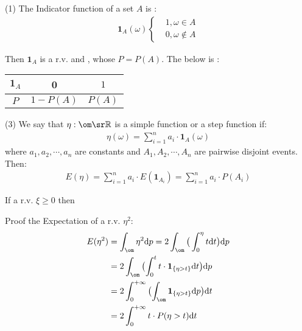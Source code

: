 \begin{definition}
     (1) The Indicator function of a set $A$ is :
    \begin{align*}
        \mathbf{1}_A(\omega)
        \left\{
        \begin{aligned}
            & 1, \omega \in A \\
            & 0, \omega \notin A
        \end{aligned}
        \right.
    \end{align*}

    Then $\mathbf{1}_A$ is a r.v. and , whose $P = P(A)$.
    The below is :
    \begin{center}
        \begin{tabular}{c|cc}
            $\mathbf{1}_A$ & 0 & $1$\\
            \hline
            $P$ & $1-P(A)$ & $P(A)$
        \end{tabular}
        \quad {}
    \end{center}

    \noindent(3) We say that $\eta:\om \sr \rr$ is a simple function or a step function if:
    \begin{align*}
    \eta (\omega) = \sum_{i=1}^{n}{a_i\cdot\mathbf{1}_A(\omega)}
    \end{align*}
    where $a_1, a_2, \cdots, a_n$ are constants and $A_1, A_2, \cdots, A_n$ are pairwise disjoint events. Then:
    \begin{align*}
        E(\eta) = \sum_{i=1}^{n}{a_i\cdot E(\mathbf{1}_{A_{i}})} = \sum_{i=1}^{n}{a_i\cdot P(A_i)}
    \end{align*}

    \remark If a r.v. $\xi\ge 0$ then   
\end{definition}

\newcommand{\D}{\ensuremath{\mathrm{d}}}
Proof the Expectation of a r.v. $\eta^2$:
\begin{align*}
    E(\eta^2)  
    & = \int_{\om}^{}{\eta^2 \D p} = 2 \int_{\om}^{}{\big(\int_{0}^{\eta}{t \D t} \big) \D p} \\
    & = 2 \int_{\om}^{}{\bigl(\int_{0}^{t}{t \cdot \mathbf{1}_{\{\eta > t\}}} \D t\bigr) \D p} \\
    & = 2 \int_{0}^{+\infty}{\bigl(\int_{\om}^{}{\mathbf{1}_{\{\eta > t\}} \D p} \bigr) \D t} \\
    & = 2 \int_{0}^{+\infty}{t\cdot P(\eta > t) \D t}
\end{align*}
